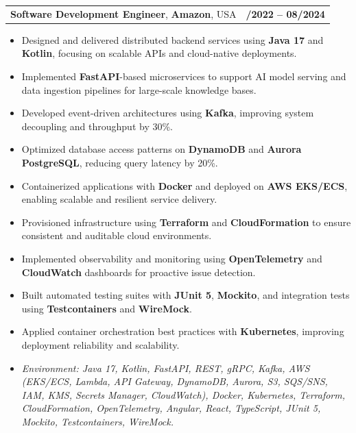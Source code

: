 \documentclass[letterpaper,11pt]{article}
\makeatletter
\newcommand{\resumeItem}[1]{
  \item\footnotesize{
    {#1 \vspace{-2pt}}
  }
}
\newcommand{\resumeSubheading}[4]{
  \vspace{-2pt}\item
    \begin{tabular*}{1.0\textwidth}[t]{l@{\extracolsep{\fill}}r}
      \textbf{\fontsize{10pt}{14pt}\selectfont #3}, \textbf{\fontsize{10pt}{14pt}\selectfont #1}, \fontsize{10pt}{14pt}\selectfont #4 & \textbf{\fontsize{10pt}{14pt}\selectfont #2} \\
    \end{tabular*}\vspace{-7pt}
}
\newcommand{\resumeItemListStart}{\begin{itemize}[leftmargin=*]}
\newcommand{\resumeItemListEnd}{\end{itemize}\vspace{-5pt}}
\makeatother
\begin{document}
\resumeSubheading
{Amazon}{10/2022 -- 08/2024}
{Software Development Engineer}{USA}
\resumeItemListStart
  \resumeItem{Designed and delivered distributed backend services using \textbf{Java 17} and \textbf{Kotlin}, focusing on scalable APIs and cloud-native deployments.}
  \resumeItem{Implemented \textbf{FastAPI}-based microservices to support AI model serving and data ingestion pipelines for large-scale knowledge bases.}
  \resumeItem{Developed event-driven architectures using \textbf{Kafka}, improving system decoupling and throughput by 30\%.}
  \resumeItem{Optimized database access patterns on \textbf{DynamoDB} and \textbf{Aurora PostgreSQL}, reducing query latency by 20\%.}
  \resumeItem{Containerized applications with \textbf{Docker} and deployed on \textbf{AWS EKS/ECS}, enabling scalable and resilient service delivery.}
  \resumeItem{Provisioned infrastructure using \textbf{Terraform} and \textbf{CloudFormation} to ensure consistent and auditable cloud environments.}
  \resumeItem{Implemented observability and monitoring using \textbf{OpenTelemetry} and \textbf{CloudWatch} dashboards for proactive issue detection.}
  \resumeItem{Built automated testing suites with \textbf{JUnit 5}, \textbf{Mockito}, and integration tests using \textbf{Testcontainers} and \textbf{WireMock}.}
  \resumeItem{Applied container orchestration best practices with \textbf{Kubernetes}, improving deployment reliability and scalability.}
  \resumeItem{\textit{Environment: Java 17, Kotlin, FastAPI, REST, gRPC, Kafka, AWS (EKS/ECS, Lambda, API Gateway, DynamoDB, Aurora, S3, SQS/SNS, IAM, KMS, Secrets Manager, CloudWatch), Docker, Kubernetes, Terraform, CloudFormation, OpenTelemetry, Angular, React, TypeScript, JUnit 5, Mockito, Testcontainers, WireMock.}}
\resumeItemListEnd
\end{document}
